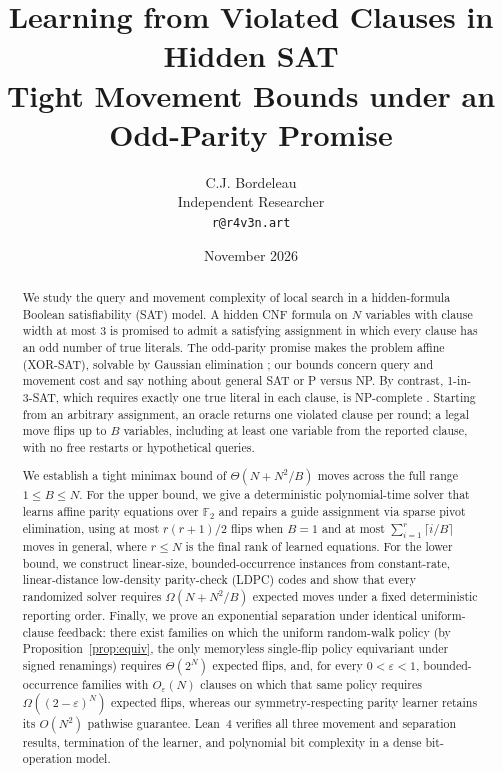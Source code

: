 \documentclass[11pt,a4paper]{article}
\title{Learning from Violated Clauses in Hidden SAT\\[0.35em]{\large Tight Movement Bounds under an Odd-Parity Promise}}
\author{C.J. Bordeleau\\
\small Independent Researcher\\
\small \texttt{r@r4v3n.art}}
\date{November 2026}
\theoremstyle{definition}
\theoremstyle{remark}
\newcommand{\F}{\mathbb{F}}
\begin{document}
\maketitle

\begin{abstract}
We study the query and movement complexity of local search in a hidden-formula Boolean satisfiability (SAT) model. A hidden CNF formula on $N$ variables with clause width at most $3$ is promised to admit a satisfying assignment in which every clause has an odd number of true literals. The odd-parity promise makes the problem affine (XOR-SAT), solvable by Gaussian elimination \cite{schaefer1978}; our bounds concern query and movement cost and say nothing about general SAT or P versus NP. By contrast, 1-in-3-SAT, which requires exactly one true literal in each clause, is NP-complete \cite{schaefer1978}. Starting from an arbitrary assignment, an oracle returns one violated clause per round; a legal move flips up to $B$ variables, including at least one variable from the reported clause, with no free restarts or hypothetical queries.

We establish a tight minimax bound of $\Theta(N + N^2/B)$ moves across the full range $1 \le B \le N$. For the upper bound, we give a deterministic polynomial-time solver that learns affine parity equations over $\F_2$ and repairs a guide assignment via sparse pivot elimination, using at most $r(r+1)/2$ flips when $B=1$ and at most $\sum_{i=1}^r\lceil i/B\rceil$ moves in general, where $r \le N$ is the final rank of learned equations. For the lower bound, we construct linear-size, bounded-occurrence instances from constant-rate, linear-distance low-density parity-check (LDPC) codes and show that every randomized solver requires $\Omega(N + N^2/B)$ expected moves under a fixed deterministic reporting order. Finally, we prove an exponential separation under identical uniform-clause feedback: there exist families on which the uniform random-walk policy (by Proposition~\ref{prop:equiv}, the only memoryless single-flip policy equivariant under signed renamings) requires $\Theta(2^N)$ expected flips, and, for every $0<\varepsilon<1$, bounded-occurrence families with $O_\varepsilon(N)$ clauses on which that same policy requires $\Omega((2-\varepsilon)^N)$ expected flips, whereas our symmetry-respecting parity learner retains its $O(N^2)$ pathwise guarantee. Lean~4 verifies all three movement and separation results, termination of the learner, and polynomial bit complexity in a dense bit-operation model.
\end{abstract}
\end{document}
